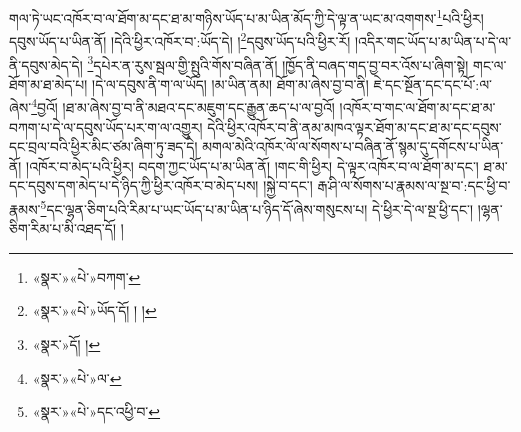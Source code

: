 གལ་ཏེ་ཡང་འཁོར་བ་ལ་ཐོག་མ་དང་ཐ་མ་གཉིས་ཡོད་པ་མ་ཡིན་མོད་ཀྱི་དེ་ལྟ་ན་ཡང་མ་འགགས་\footnote{«སྣར་»«པེ་»བཀག་}པའི་ཕྱིར། དབུས་ཡོད་པ་ཡིན་ནོ། །དེའི་ཕྱིར་འཁོར་བ་:ཡོད་དེ། །\footnote{«སྣར་»«པེ་»ཡོད་དོ། ། །}དབུས་ཡོད་པའི་ཕྱིར་རོ། །འདིར་གང་ཡོད་པ་མ་ཡིན་པ་དེ་ལ་ནི་དབུས་མེད་དེ། \footnote{«སྣར་»དོ། ། }དཔེར་ན་རུས་སྦལ་གྱི་སྤུའི་གོས་བཞིན་ནོ། །ཁྱོད་ནི་བཞད་གད་བྱ་བར་འོས་པ་ཞིག་སྟེ། གང་ལ་ཐོག་མ་ཐ་མེད་པ། །དེ་ལ་དབུས་ནི་ག་ལ་ཡོད། །མ་ཡིན་ནམ། ཐོག་མ་ཞེས་བྱ་བ་ནི། ཇེ་དང་སྔོན་དང་དང་པོ་:ལ་ཞེས་\footnote{«སྣར་»«པེ་»ལ་}བྱའོ། །ཐ་མ་ཞེས་བྱ་བ་ནི་མཐའ་དང་མཇུག་དང་རྒྱུན་ཆད་པ་ལ་བྱའོ། །འཁོར་བ་གང་ལ་ཐོག་མ་དང་ཐ་མ་བཀག་པ་དེ་ལ་དབུས་ཡོད་པར་ག་ལ་འགྱུར། དེའི་ཕྱིར་འཁོར་བ་ནི་ནམ་མཁའ་ལྟར་ཐོག་མ་དང་ཐ་མ་དང་དབུས་དང་བྲལ་བའི་ཕྱིར་མིང་ཙམ་ཞིག་ཏུ་ཟད་དེ། མགལ་མེའི་འཁོར་ལོ་ལ་སོགས་པ་བཞིན་ནོ་སྙམ་དུ་དགོངས་པ་ཡིན་ནོ། །འཁོར་བ་མེད་པའི་ཕྱིར། བདག་ཀྱང་ཡོད་པ་མ་ཡིན་ནོ། །གང་གི་ཕྱིར། དེ་ལྟར་འཁོར་བ་ལ་ཐོག་མ་དང་། ཐ་མ་དང་དབུས་དག་མེད་པ་དེ་ཉིད་ཀྱི་ཕྱིར་འཁོར་བ་མེད་པས། །སྐྱེ་བ་དང་། རྒ་ཤི་ལ་སོགས་པ་རྣམས་ལ་སྔ་བ་:དང་ཕྱི་བ་རྣམས་\footnote{«སྣར་»«པེ་»དང་འཕྱི་བ་}དང་ལྷན་ཅིག་པའི་རིམ་པ་ཡང་ཡོད་པ་མ་ཡིན་པ་ཉིད་དོ་ཞེས་གསུངས་པ། དེ་ཕྱིར་དེ་ལ་སྔ་ཕྱི་དང་། །ལྷན་ཅིག་རིམ་པ་མི་འཐད་དོ། །
